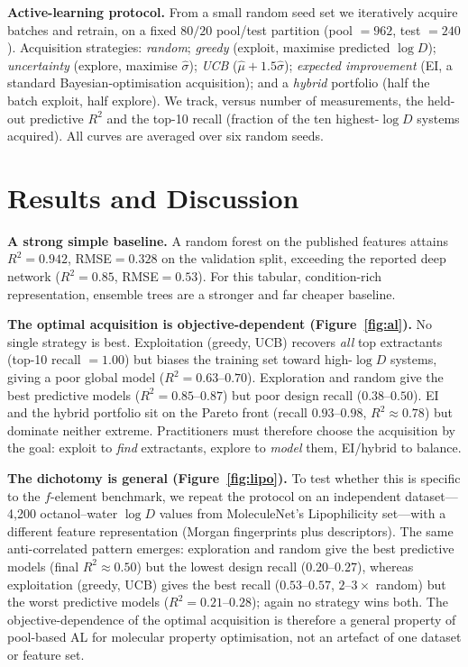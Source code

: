 \documentclass[journal=jcisd8,manuscript=article]{achemso}
\begin{document}
\textbf{Active-learning protocol.} From a small random seed set we iteratively
acquire batches and retrain, on a fixed $80/20$ pool/test partition (pool
$=962$, test $=240$). Acquisition strategies: \emph{random}; \emph{greedy}
(exploit, maximise predicted $\log D$); \emph{uncertainty} (explore, maximise
$\hat\sigma$); \emph{UCB} ($\hat\mu+1.5\hat\sigma$); \emph{expected improvement}
(EI, a standard Bayesian-optimisation acquisition\cite{Jones_1998,Shahriari_2016});
and a \emph{hybrid} portfolio (half the batch exploit, half explore). We track,
versus number of measurements, the held-out predictive $R^2$ and the top-10 recall
(fraction of the ten highest-$\log D$ systems acquired). All curves are averaged over
six random seeds.

\section{Results and Discussion}
\textbf{A strong simple baseline.} A random forest on the published features attains
$R^2=0.942$, RMSE$=0.328$ on the validation split, exceeding the reported deep
network ($R^2=0.85$, RMSE$=0.53$).\cite{Liu_2022} For this tabular,
condition-rich representation, ensemble trees are a stronger and far cheaper baseline.

\textbf{The optimal acquisition is objective-dependent (Figure~\ref{fig:al}).} No
single strategy is best. Exploitation (greedy, UCB) recovers \emph{all} top
extractants (top-10 recall $=1.00$) but biases the training set toward high-$\log D$
systems, giving a poor global model ($R^2=0.63$--$0.70$). Exploration and random give
the best predictive models ($R^2=0.85$--$0.87$) but poor design recall
($0.38$--$0.50$). EI and the hybrid portfolio sit on the Pareto front (recall
$0.93$--$0.98$, $R^2\approx0.78$) but dominate neither extreme. Practitioners must
therefore choose the acquisition by the goal: exploit to \emph{find} extractants,
explore to \emph{model} them, EI/hybrid to balance.

\textbf{The dichotomy is general (Figure~\ref{fig:lipo}).} To test whether this is
specific to the $f$-element benchmark, we repeat the protocol on an independent
dataset---4{,}200 octanol--water $\log D$ values from MoleculeNet's Lipophilicity
set\cite{Wu_2018}---with a different feature representation (Morgan fingerprints plus
descriptors). The same anti-correlated pattern emerges: exploration and random give
the best predictive models (final $R^2\approx0.50$) but the lowest design recall
($0.20$--$0.27$), whereas exploitation (greedy, UCB) gives the best recall
($0.53$--$0.57$, $2$--$3\times$ random) but the worst predictive models
($R^2=0.21$--$0.28$); again no strategy wins both. The objective-dependence of the
optimal acquisition is therefore a general property of pool-based AL for molecular
property optimisation, not an artefact of one dataset or feature set.
\end{document}
